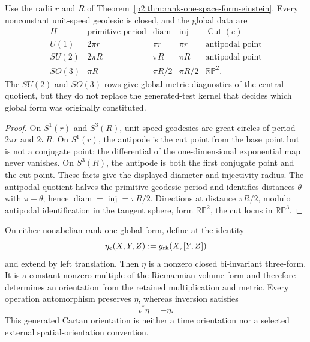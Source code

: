 \documentclass[11pt,a4paper]{article}
\begin{document}
\begin{theorem}
\label{p2:thm:rank-one-geodesic-cut-locus}
Use the radii \(r\) and \(R\) of
Theorem~\ref{p2:thm:rank-one-space-form-einstein}.  Every nonconstant
unit-speed geodesic is closed, and the global data are
\[
\begin{array}{c|c|c|c|c}
H&\text{primitive period}&\operatorname{diam}&\operatorname{inj}&
\operatorname{Cut}(e)\\ \hline
U(1)&2\pi r&\pi r&\pi r&\text{antipodal point}\\
SU(2)&2\pi R&\pi R&\pi R&\text{antipodal point}\\
SO(3)&\pi R&\pi R/2&\pi R/2&\mathbb{RP}^2 .
\end{array}
\]
The \(SU(2)\) and \(SO(3)\) rows give global metric diagnostics of the
central quotient, but they do not replace the generated-test kernel that
decides which global form was originally constituted.
\end{theorem}

\begin{proof}
On \(S^1(r)\) and \(S^3(R)\), unit-speed geodesics are great circles of
period \(2\pi r\) and \(2\pi R\).  On \(S^1(r)\), the antipode is the cut
point from the base point but is not a conjugate point: the differential of
the one-dimensional exponential map never vanishes.  On \(S^3(R)\), the
antipode is both the first conjugate point and the cut point.  These facts
give the displayed diameter and injectivity radius.  The antipodal quotient
halves the primitive geodesic
period and identifies distances \(\theta\) with \(\pi-\theta\); hence
\(\operatorname{diam}=\operatorname{inj}=\pi R/2\).  Directions at distance
\(\pi R/2\), modulo antipodal identification in the tangent sphere, form
\(\mathbb{RP}^2\), the cut locus in \(\mathbb{RP}^3\).
\end{proof}

\begin{theorem}
\label{p2:thm:rank-one-cartan-orientation}
On either nonabelian rank-one global form, define at the identity
\[
 \eta_e(X,Y,Z):=g_{\rm rk}(X,[Y,Z])
\]
and extend by left translation.  Then \(\eta\) is a nonzero closed
bi-invariant three-form.  It is a constant nonzero multiple of the Riemannian
volume form and therefore determines an orientation from the retained
multiplication and metric.  Every operation automorphism preserves \(\eta\),
whereas inversion satisfies
\[
 \iota^*\eta=-\eta.
\]
This generated Cartan orientation is neither a time orientation nor a
selected external spatial-orientation convention.
\end{theorem}
\end{document}
